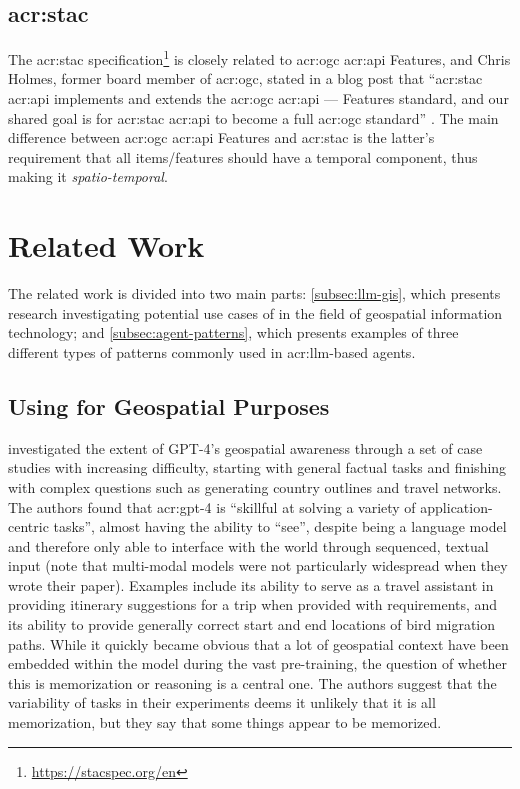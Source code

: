 \subsection[SpatioTemporal Asset Catalogs]{\acrlong{acr:stac}}
\label{subsec:stac}

The \gls{acr:stac} specification\footnote{\url{https://stacspec.org/en}} is closely related to \acrshort{acr:ogc} \acrshort{acr:api} Features, and Chris Holmes, former board member of \acrlong{acr:ogc}, stated in a blog post that \enquote{\acrshort{acr:stac} \acrshort{acr:api} implements and extends the \acrshort{acr:ogc} \acrshort{acr:api} — Features standard, and our shared goal is for \acrshort{acr:stac} \acrshort{acr:api} to become a full \acrshort{acr:ogc} standard} \citep{holmesSpatioTemporalAssetCatalogs2021a}. The main difference between \acrshort{acr:ogc} \acrshort{acr:api} Features and \acrshort{acr:stac} is the latter's requirement that all items/features should have a temporal component, thus making it \textit{spatio-temporal}.


\section{Related Work}
\label{sec:related-work}

The related work is divided into two main parts: \autoref{subsec:llm-gis}, which presents research investigating potential use cases of  in the field of geospatial information technology; and \autoref{subsec:agent-patterns}, which presents examples of three different types of patterns commonly used in \acrshort{acr:llm}-based agents.

\subsection[Using LLMs for Geospatial Purposes]{Using  for Geospatial Purposes}
\label{subsec:llm-gis}

\cite{robertsGPT4GEOHowLanguage2023} investigated the extent of GPT-4's geospatial awareness through a set of case studies with increasing difficulty, starting with general factual tasks and finishing with complex questions such as generating country outlines and travel networks. The authors found that \acrshort{acr:gpt}-4 is \enquote{skillful at solving a variety of application-centric tasks}, almost having the ability to \enquote{see}, despite being a language model and therefore only able to interface with the world through sequenced, textual input (note that multi-modal models were not particularly widespread when they wrote their paper). Examples include its ability to serve as a travel assistant in providing itinerary suggestions for a trip when provided with requirements, and its ability to provide generally correct start and end locations of bird migration paths. While it quickly became obvious that a lot of geospatial context have been embedded within the model during the vast pre-training, the question of whether this is memorization or reasoning is a central one. The authors suggest that the variability of tasks in their experiments deems it unlikely that it is all memorization, but they say that some things appear to be memorized.

